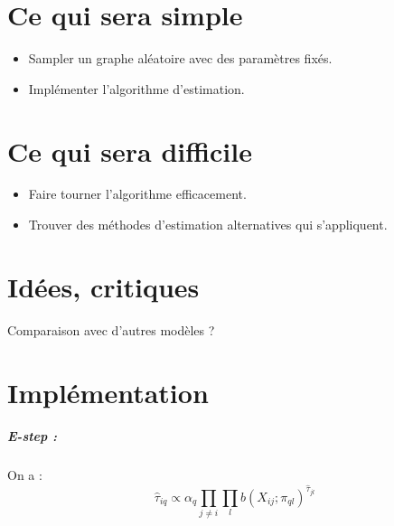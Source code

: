 \section{Ce qui sera simple}

\begin{itemize}
    \item Sampler un graphe aléatoire avec des paramètres fixés.
    \item Implémenter l'algorithme d'estimation.
\end{itemize}

\section{Ce qui sera difficile}

\begin{itemize}
    \item Faire tourner l'algorithme efficacement.
    \item Trouver des méthodes d'estimation alternatives qui s'appliquent.
\end{itemize}

\section{Idées, critiques}

Comparaison avec d'autres modèles ?

\section{Implémentation}

\subparagraph*{E-step :}

On a :
\begin{equation}
    \hat{\tau}_{iq} \propto \alpha_q\prod_{j\neq i}\prod_lb(X_{ij};\pi_{ql})^{\hat{\tau}_{jl}}
\end{equation}
